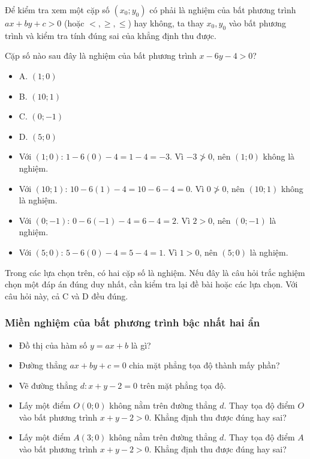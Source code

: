\begin{emdahoc}
Để kiểm tra xem một cặp số $(x_0; y_0)$ có phải là nghiệm của bất phương trình $ax + by + c > 0$ (hoặc $<, \ge, \le$) hay không, ta thay $x_0, y_0$ vào bất phương trình và kiểm tra tính đúng sai của khẳng định thu được.
\end{emdahoc}

\begin{emcothe}
Cặp số nào sau đây là nghiệm của bất phương trình $x - 6y - 4 > 0$?
\begin{itemize}
    \item A. $(1; 0)$
    \item B. $(10; 1)$
    \item C. $(0; -1)$
    \item D. $(5; 0)$
\end{itemize}
\begin{itemize}
    \item Với $(1; 0)$: $1 - 6(0) - 4 = 1 - 4 = -3$. Vì $-3 \ngtr 0$, nên $(1; 0)$ không là nghiệm.
    \item Với $(10; 1)$: $10 - 6(1) - 4 = 10 - 6 - 4 = 0$. Vì $0 \ngtr 0$, nên $(10; 1)$ không là nghiệm.
    \item Với $(0; -1)$: $0 - 6(-1) - 4 = 6 - 4 = 2$. Vì $2 > 0$, nên $(0; -1)$ là nghiệm.
    \item Với $(5; 0)$: $5 - 6(0) - 4 = 5 - 4 = 1$. Vì $1 > 0$, nên $(5; 0)$ là nghiệm.
\end{itemize}
Trong các lựa chọn trên, có hai cặp số là nghiệm. Nếu đây là câu hỏi trắc nghiệm chọn một đáp án đúng duy nhất, cần kiểm tra lại đề bài hoặc các lựa chọn. Với câu hỏi này, cả C và D đều đúng.
\end{emcothe}

\subsubsection{Miền nghiệm của bất phương trình bậc nhất hai ẩn}

\begin{hoatdong}
\begin{itemize}
    \item Đồ thị của hàm số $y = ax + b$ là gì?
    \item Đường thẳng $ax + by + c = 0$ chia mặt phẳng tọa độ thành mấy phần?
\end{itemize}
\begin{itemize}
    \item Vẽ đường thẳng $d: x + y - 2 = 0$ trên mặt phẳng tọa độ.
    \item Lấy một điểm $O(0; 0)$ không nằm trên đường thẳng $d$. Thay tọa độ điểm $O$ vào bất phương trình $x + y - 2 > 0$. Khẳng định thu được đúng hay sai?
    \item Lấy một điểm $A(3; 0)$ không nằm trên đường thẳng $d$. Thay tọa độ điểm $A$ vào bất phương trình $x + y - 2 > 0$. Khẳng định thu được đúng hay sai?
\end{itemize}
\end{hoatdong}

